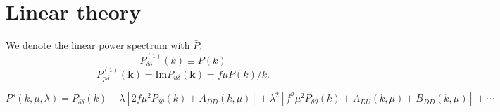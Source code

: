 \documentclass[a4paper,11pt, fleqn]{article}
\begin{document}
\clearpage
\section{Linear theory}

We denote the linear power spectrum with $\bar{P}$,
\begin{equation}
  P_{\delta\delta}^{(1)}(k) \equiv \bar{P}(k)
\end{equation}
\begin{equation}
  P_{p\delta}^{(1)}(\bm{k}) = \mathrm{Im} \bar{P}_{u\delta}(\bm{k})
  = f\mu \bar{P}(k)/k.
\end{equation}

\begin{equation}
  P^{s}(k, \mu, \lambda) = P_{\delta\delta}(k) + \lambda \left[
    2f\mu^2 P_{\delta \theta}(k) + A_{DD}(k, \mu) \right]
  + \lambda^2 \left[
    f^2 \mu^2 P_{\theta\theta}(k) + A_{DU}(k, \mu) + B_{DD}(k, \mu) \right]
  + \cdots
\end{equation}
\end{document}
